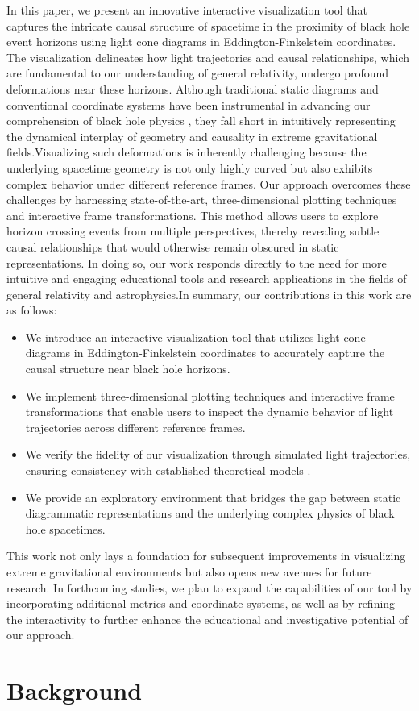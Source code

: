 \documentclass{article}
\begin{document}
In this paper, we present an innovative interactive visualization tool that captures the intricate causal structure of spacetime in the proximity of black hole event horizons using light cone diagrams in Eddington-Finkelstein coordinates. The visualization delineates how light trajectories and causal relationships, which are fundamental to our understanding of general relativity, undergo profound deformations near these horizons. Although traditional static diagrams and conventional coordinate systems have been instrumental in advancing our comprehension of black hole physics \cite{ref1}, they fall short in intuitively representing the dynamical interplay of geometry and causality in extreme gravitational fields.Visualizing such deformations is inherently challenging because the underlying spacetime geometry is not only highly curved but also exhibits complex behavior under different reference frames. Our approach overcomes these challenges by harnessing state-of-the-art, three-dimensional plotting techniques and interactive frame transformations. This method allows users to explore horizon crossing events from multiple perspectives, thereby revealing subtle causal relationships that would otherwise remain obscured in static representations. In doing so, our work responds directly to the need for more intuitive and engaging educational tools and research applications in the fields of general relativity and astrophysics.In summary, our contributions in this work are as follows:\begin{itemize}  \item We introduce an interactive visualization tool that utilizes light cone diagrams in Eddington-Finkelstein coordinates to accurately capture the causal structure near black hole horizons.  \item We implement three-dimensional plotting techniques and interactive frame transformations that enable users to inspect the dynamic behavior of light trajectories across different reference frames.  \item We verify the fidelity of our visualization through simulated light trajectories, ensuring consistency with established theoretical models \cite{ref2}.  \item We provide an exploratory environment that bridges the gap between static diagrammatic representations and the underlying complex physics of black hole spacetimes.\end{itemize}This work not only lays a foundation for subsequent improvements in visualizing extreme gravitational environments but also opens new avenues for future research. In forthcoming studies, we plan to expand the capabilities of our tool by incorporating additional metrics and coordinate systems, as well as by refining the interactivity to further enhance the educational and investigative potential of our approach.\section{Background}
\end{document}
